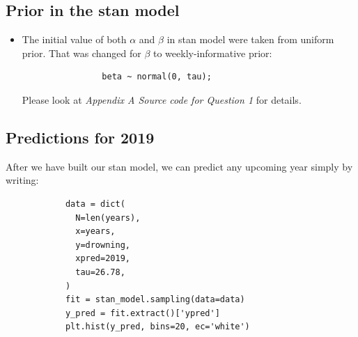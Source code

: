 \documentclass[11pt,a4paper,english]{article}
\begin{document}
        \subsection{Prior in the stan model}
          \begin{itemize}
            \item
              The initial value of both $\alpha$ and $\beta$ in stan model were taken from uniform prior. That was changed for $\beta$ to weekly-informative prior:
              \begin{verbatim}
                beta ~ normal(0, tau);
              \end{verbatim}
              Please look at \textit{Appendix A  Source code for Question 1} for details.
          \end{itemize}

        \subsection{Predictions for 2019}
          After we have built our stan model, we can predict any upcoming year simply by writing:

          \begin{verbatim}
            data = dict(
              N=len(years),
              x=years,
              y=drowning,
              xpred=2019,
              tau=26.78,
            )
            fit = stan_model.sampling(data=data)
            y_pred = fit.extract()['ypred']
            plt.hist(y_pred, bins=20, ec='white')
          \end{verbatim}
\end{document}

